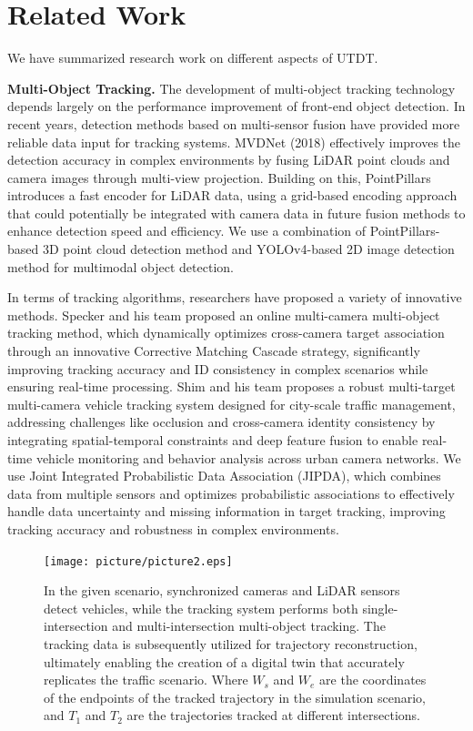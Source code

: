 \documentclass[journal,twoside,web]{ieeecolor}
\begin{document}
\section{Related Work}

We have summarized research work on different aspects of UTDT.

\textbf{Multi-Object Tracking.}
The development of multi-object tracking technology depends largely on the performance improvement of front-end object detection.
In recent years, detection methods based on multi-sensor fusion have provided more reliable data input for tracking systems.
MVDNet (2018) effectively improves the detection accuracy in complex environments by fusing LiDAR point clouds and camera images through multi-view projection\cite{Alpher22h}.
Building on this, PointPillars introduces a fast encoder for LiDAR data, using a grid-based encoding approach that could potentially be integrated with camera data in future fusion methods to enhance detection speed and efficiency\cite{Alpher19}.
We use a combination of PointPillars-based 3D point cloud detection method and YOLOv4-based 2D image detection method for multimodal object detection.

In terms of tracking algorithms, researchers have proposed a variety of innovative methods.
Specker and his team proposed an online multi-camera multi-object tracking method, which dynamically optimizes cross-camera target association through an innovative Corrective Matching Cascade strategy, significantly improving tracking accuracy and ID consistency in complex scenarios while ensuring real-time processing\cite{Alpher24e}.
Shim and his team proposes a robust multi-target multi-camera vehicle tracking system designed for city-scale traffic management, addressing challenges like occlusion and cross-camera identity consistency by integrating spatial-temporal constraints and deep feature fusion to enable real-time vehicle monitoring and behavior analysis across urban camera networks\cite{Alpher21e}.
We use Joint Integrated Probabilistic Data Association (JIPDA), which combines data from multiple sensors and optimizes probabilistic associations to effectively handle data uncertainty and missing information in target tracking, improving tracking accuracy and robustness in complex environments.

\begin{figure}[t]
	\centerline{\texttt{[image: picture/picture2.eps]}}
	\caption{In the given scenario, synchronized cameras and LiDAR sensors detect vehicles, while the tracking system performs both single-intersection and multi-intersection multi-object tracking. The tracking data is subsequently utilized for trajectory reconstruction, ultimately enabling the creation of a digital twin that accurately replicates the traffic scenario. Where \(W_{s}\) and \(W_{e}\) are the coordinates of the endpoints of the tracked trajectory in the simulation scenario, and \(T_{1}\) and \(T_{2}\) are the trajectories tracked at different intersections.}
	\label{fig:2}
\end{figure}
\end{document}
